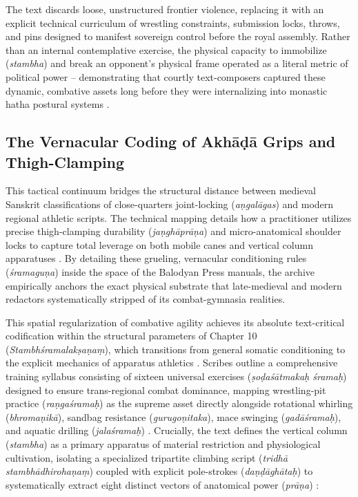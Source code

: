 \documentclass[11pt,twoside,letterpaper]{article}
\begin{document}
The text discards loose, unstructured frontier violence, replacing it with an explicit technical curriculum of wrestling constraints, submission locks, throws, and pins designed to manifest sovereign control before the royal assembly. Rather than an internal contemplative exercise, the physical capacity to immobilize (\textit{stambha}) and break an opponent’s physical frame operated as a literal metric of political power – demonstrating that courtly text-composers captured these dynamic, combative assets long before they were internalizing into monastic hatha postural systems \citep{OHanlon2007}.

\subsection{The Vernacular Coding of Akhāḍā Grips and Thigh-Clamping}
This tactical continuum bridges the structural distance between medieval Sanskrit classifications of close-quarters joint-locking (\textit{aṇgalāgas}) and modern regional athletic scripts. The technical mapping details how a practitioner utilizes precise thigh-clamping durability (\textit{jaṇghāprāṇa}) and micro-anatomical shoulder locks to capture total leverage on both mobile canes and vertical column apparatuses \citep{Khasgivale1929}. By detailing these grueling, vernacular conditioning rules (\textit{śramaguṇa}) inside the space of the Balodyan Press manuals, the archive empirically anchors the exact physical substrate that late-medieval and modern redactors systematically stripped of its combat-gymnasia realities.

This spatial regularization of combative agility achieves its absolute text-critical codification within the structural parameters of Chapter 10 (\textit{Stambhśramalakṣaṇaṃ}), which transitions from general somatic conditioning to the explicit mechanics of apparatus athletics \citep{MP_7}. Scribes outline a comprehensive training syllabus consisting of sixteen universal exercises (\textit{ṣoḍaśātmakaḥ śramaḥ}) designed to ensure trans-regional combat dominance, mapping wrestling-pit practice (\textit{raṇgaśramaḥ}) as the supreme asset directly alongside rotational whirling (\textit{bhromaṇikā}), sandbag resistance (\textit{gurugoṇitaka}), mace swinging (\textit{gadāśramaḥ}), and aquatic drilling (\textit{jalaśramaḥ}) \citep{MP_7}. Crucially, the text defines the vertical column (\textit{stambha}) as a primary apparatus of material restriction and physiological cultivation, isolating a specialized tripartite climbing script (\textit{tridhā stambhādhirohaṇaṃ}) coupled with explicit pole-strokes (\textit{daṇḍāghātaḥ}) to systematically extract eight distinct vectors of anatomical power (\textit{prāṇa}) \citep{MP_7}:
\end{document}
